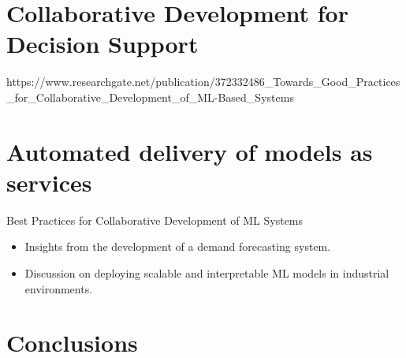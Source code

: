 

\section{Collaborative Development for Decision Support}
\label{sec:collaborative_development}
https://www.researchgate.net/publication/372332486_Towards_Good_Practices_for_Collaborative_Development_of_ML-Based_Systems





\section{Automated delivery of models as services}

Best Practices for Collaborative Development of ML Systems
\begin{itemize}
\item Insights from the development of a demand forecasting system.
\item Discussion on deploying scalable and interpretable ML models in industrial environments.
\end{itemize}


\section{Conclusions}

